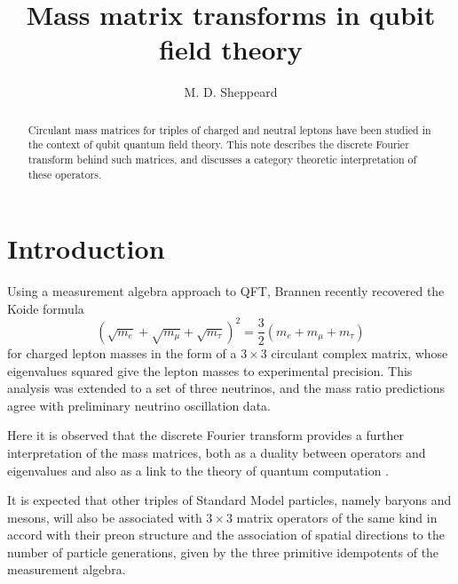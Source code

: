 \documentclass[aps,prl,onecolumn,showpacs,address,11pt]{revtex4}
\begin{document}
\title{Mass matrix transforms in qubit field theory}

\author{M. D. Sheppeard}

\begin{abstract}
Circulant mass matrices for triples of charged and neutral leptons
have been studied in the context of qubit quantum field theory.
This note describes the discrete Fourier transform behind such
matrices, and discusses a category theoretic interpretation of
these operators.
\end{abstract}



\maketitle
\thispagestyle{empty}

\section{Introduction}

Using a measurement algebra approach to QFT, Brannen
\cite{Brannen} recently recovered the Koide \cite{Koide1} formula
\begin{equation} (\sqrt{m_{e}} + \sqrt{m_{\mu}} + \sqrt{m_{\tau}})^{2} = \frac{3}{2}
(m_{e} + m_{\mu} + m_{\tau}) \end{equation} for charged lepton
masses in the form of a $3 \times 3$ circulant complex matrix,
whose eigenvalues squared give the lepton masses to experimental
precision. This analysis was extended to a set of three neutrinos,
and the mass ratio predictions agree with preliminary neutrino
oscillation data.

Here it is observed that the discrete Fourier transform
\cite{AdrovBook} provides a further interpretation of the mass
matrices, both as a duality between operators and eigenvalues and
also as a link to the theory of quantum computation
\cite{NielsenChuang}.

It is expected that other triples of Standard Model particles,
namely baryons and mesons, will also be associated with $3 \times
3$ matrix operators of the same kind in accord with their preon
structure \cite{Brannen} and the association of spatial directions
to the number of particle generations, given by the three
primitive idempotents of the measurement algebra.
\end{document}
